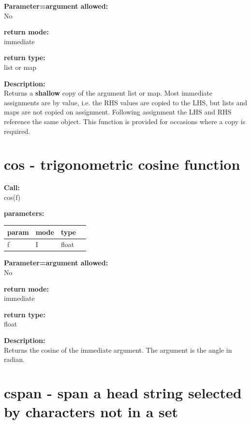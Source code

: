         {\bf Parameter=argument allowed:} \\
        No
        
        {\bf return mode:} \\
        immediate

        {\bf return type:} \\
        list or map
        
        {\bf Description:} \\
        Returns a {\bf shallow} copy of the argument list or map. Most immediate
        assignments are by value, i.e. the RHS values are copied to the LHS, but
        lists and maps are not copied on assignment. Following assignment the
        LHS and RHS reference the same object. This function is provided for
        occasions where a copy is required.


    \section{cos - trigonometric cosine function}\label{sec:ifcosin}
        
        
        {\bf Call:} \\
        cos(f)
        
        {\bf parameters:} \\
        \begin{tabular}{| l | l | l | l |}
        \hline
        param  & mode & type & \\
        \hline \hline
        f & I & float & \\ \hline
        \end{tabular}
        
        {\bf Parameter=argument allowed:} \\
        No
        
        {\bf return mode:} \\
        immediate

        {\bf return type:} \\
        float
        
        {\bf Description:} \\
        Returns the cosine of the immediate argument. The argument is the
        angle in radian.


    \section{cspan - span a head string selected by characters not in a set}\label{sec:ifcspan}
        
